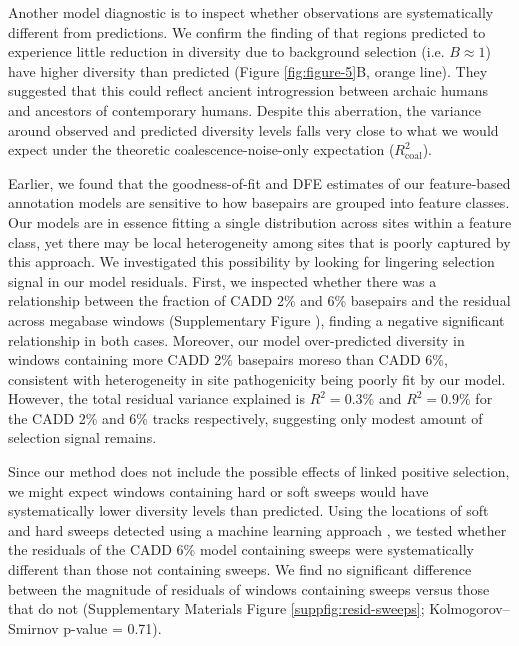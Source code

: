 \documentclass[11pt]{article}
\begin{document}
Another model diagnostic is to inspect whether observations are systematically
different from predictions. We confirm the finding of \textcite{Murphy2022-sj}
that regions predicted to experience little reduction in diversity due to
background selection (i.e. $B\approx 1$) have higher diversity than predicted
(Figure \ref{fig:figure-5}B, orange line). They suggested that this could
reflect ancient introgression between archaic humans and ancestors of
contemporary humans. Despite this aberration, the variance around observed and
predicted diversity levels falls very close to what we would expect under the
theoretic coalescence-noise-only expectation ($R_\text{coal}^2$).

Earlier, we found that the goodness-of-fit and DFE estimates of our
feature-based annotation models are sensitive to how basepairs are grouped into
feature classes. Our models are in essence fitting a single distribution across
sites within a feature class, yet there may be local heterogeneity among sites
that is poorly captured by this approach. We investigated this possibility by
looking for lingering selection signal in our model residuals. First, we
inspected whether there was a relationship between the fraction of CADD 2\% and
6\% basepairs and the residual across megabase windows (Supplementary Figure
\label{suppfig:resid-cadd}), finding a negative significant relationship in
both cases. Moreover, our model over-predicted diversity in windows containing
more CADD 2\% basepairs moreso than CADD 6\%, consistent with heterogeneity in
site pathogenicity being poorly fit by our model. However, the total residual
variance explained is $R^2 = 0.3\%$ and $R^2 = 0.9\%$ for the CADD 2\% and 6\%
tracks respectively, suggesting only modest amount of selection signal remains.

Since our method does not include the possible effects of linked positive
selection, we might expect windows containing hard or soft sweeps would have
systematically lower diversity levels than predicted. Using the locations of
soft and hard sweeps detected using a machine learning approach
\parencite{Schrider2017-yx,Kern2018-jd}, we tested whether the residuals of the
CADD 6\% model containing sweeps were systematically different than those not
containing sweeps. We find no significant difference between the magnitude of
residuals of windows containing sweeps versus those that do not (Supplementary
Materials Figure \ref{suppfig:resid-sweeps}; Kolmogorov--Smirnov p-value =
0.71). 
\end{document}
